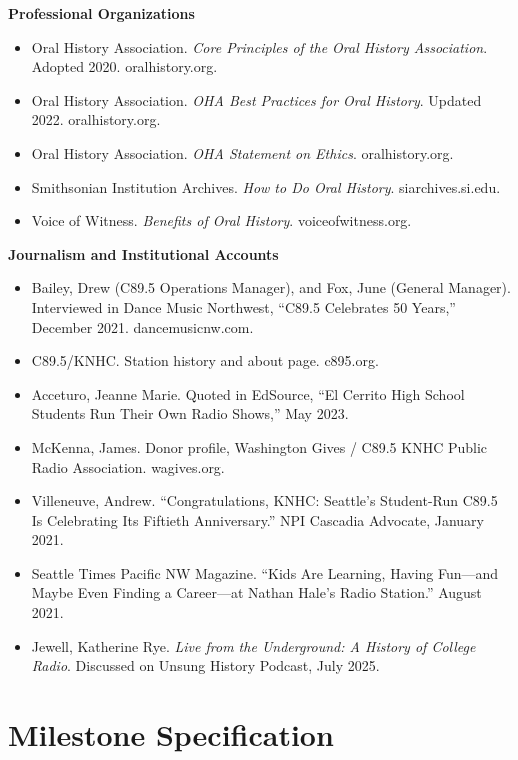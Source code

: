 \documentclass[11pt,letterpaper]{article}
\newcommand{\stageheader}[2]{%
  \noindent\colorbox{#2}{\makebox[\textwidth][l]{%
    \textcolor{white}{\bfseries\sffamily\hspace{6pt}#1\hspace{6pt}}}}%
  \vspace{0.5em}\par%
}
\begin{document}
\textbf{Professional Organizations}
\begin{itemize}
  \item Oral History Association. \textit{Core Principles of the Oral History Association}. Adopted 2020. oralhistory.org.
  \item Oral History Association. \textit{OHA Best Practices for Oral History}. Updated 2022. oralhistory.org.
  \item Oral History Association. \textit{OHA Statement on Ethics}. oralhistory.org.
  \item Smithsonian Institution Archives. \textit{How to Do Oral History}. siarchives.si.edu.
  \item Voice of Witness. \textit{Benefits of Oral History}. voiceofwitness.org.
\end{itemize}

\textbf{Journalism and Institutional Accounts}
\begin{itemize}
  \item Bailey, Drew (C89.5 Operations Manager), and Fox, June (General Manager). Interviewed in Dance Music Northwest, ``C89.5 Celebrates 50 Years,'' December 2021. dancemusicnw.com.
  \item C89.5/KNHC. Station history and about page. c895.org.
  \item Acceturo, Jeanne Marie. Quoted in EdSource, ``El Cerrito High School Students Run Their Own Radio Shows,'' May 2023.
  \item McKenna, James. Donor profile, Washington Gives / C89.5 KNHC Public Radio Association. wagives.org.
  \item Villeneuve, Andrew. ``Congratulations, KNHC: Seattle's Student-Run C89.5 Is Celebrating Its Fiftieth Anniversary.'' NPI Cascadia Advocate, January 2021.
  \item Seattle Times Pacific NW Magazine. ``Kids Are Learning, Having Fun---and Maybe Even Finding a Career---at Nathan Hale's Radio Station.'' August 2021.
  \item Jewell, Katherine Rye. \textit{Live from the Underground: A History of College Radio}. Discussed on Unsung History Podcast, July 2025.
\end{itemize}

\newpage

\stageheader{STAGE 3 --- MISSION PACKAGE}{tertiary}

\section{Milestone Specification}
\end{document}
